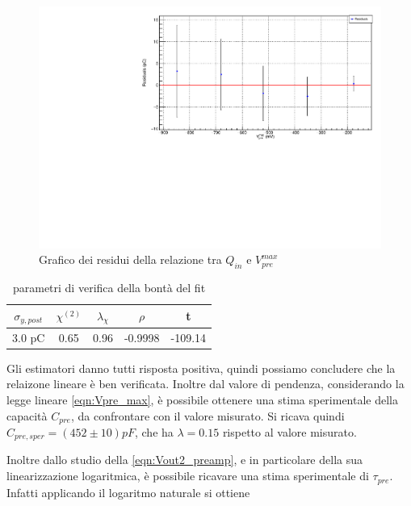 \documentclass{article}
\begin{document}
\begin{center}
\begin{figure}[H]
\centering
\includegraphics[scale=0.4, angle=0]{residuipreamp.pdf}
\caption{Grafico dei residui della relazione tra $Q_{in}$ e $V_{pre}^{max}$}
\label{fig:QinvsVpre_res}
\end{figure}
\end{center}

\begin{table}[ht]
    \centering
    \begin{tabular}{ccccc}
        \toprule
        $\sigma_{y, post}$    &$\chi^{(2)}$    &$\lambda_{\chi}$   &$\rho$ &t      \\
        \midrule
        3.0 pC                  &0.65            &0.96               &-0.9998&-109.14\\
        \bottomrule
    \end{tabular}
    \caption{parametri di verifica della bontà del fit}
\end{table}

Gli estimatori danno tutti risposta positiva, quindi possiamo concludere che la relaizone lineare è ben verificata.
Inoltre dal valore di pendenza, considerando la legge lineare \ref{eqn:Vpre_max}, è possibile ottenere una stima sperimentale della capacità $C_{pre}$, 
da confrontare con il valore misurato. Si ricava quindi $C_{pre,sper} = (452\pm 10)pF$, che ha $\lambda = 0.15 $ rispetto al valore misurato.

Inoltre dallo studio della \ref{eqn:Vout2_preamp}, e in particolare della sua linearizzazione logaritmica, è possibile ricavare
una stima sperimentale di $\tau_{pre}$. Infatti applicando il logaritmo naturale si ottiene
\end{document}
